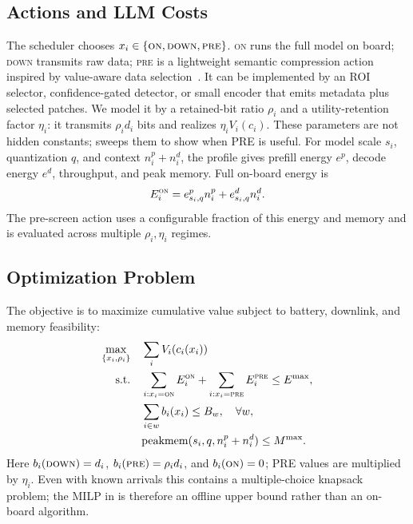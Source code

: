 \subsection{Actions and LLM Costs}
The scheduler chooses $x_i\in\{\textsc{on},\textsc{down},\textsc{pre}\}$. \textsc{on} runs the full model on board; \textsc{down} transmits raw data; \textsc{pre} is a lightweight semantic compression action inspired by value-aware data selection~\cite{denby2023kodan}. It can be implemented by an ROI selector, confidence-gated detector, or small encoder that emits metadata plus selected patches. We model it by a retained-bit ratio $\rho_i$ and a utility-retention factor $\eta_i$: it transmits $\rho_i d_i$ bits and realizes $\eta_i V_i(c_i)$. These parameters are not hidden constants;  sweeps them to show when PRE is useful. For model scale $s_i$, quantization $q$, and context $n_i^p+n_i^d$, the profile gives prefill energy $e^p$, decode energy $e^d$, throughput, and peak memory. Full on-board energy is
\begin{equation}
E_i^{\textsc{on}}=e^p_{s_i,q}n_i^p+e^d_{s_i,q}n_i^d .
\label{eq:eon}
\end{equation}
The pre-screen action uses a configurable fraction of this energy and memory and is evaluated across multiple $\rho_i,\eta_i$ regimes.

\subsection{Optimization Problem}
The objective is to maximize cumulative value subject to battery, downlink, and memory feasibility:
\begin{align}
\max_{\{x_i,\rho_i\}}\quad & \sum_i V_i(c_i(x_i)) \label{eq:obj}\\
\text{s.t.}\quad
& \sum_{i:x_i=\textsc{on}}E_i^{\textsc{on}}+\sum_{i:x_i=\textsc{pre}}E_i^{\textsc{pre}}\le E^{\max}, \label{eq:c-energy}\\
& \sum_{i\in w} b_i(x_i)\le B_w,\quad \forall w, \label{eq:c-bw}\\
& \mathrm{peakmem}(s_i,q,n_i^p+n_i^d)\le M^{\max}. \label{eq:c-mem}
\end{align}
Here $b_i(\textsc{down})=d_i$, $b_i(\textsc{pre})=\rho_i d_i$, and $b_i(\textsc{on})=0$; PRE values are multiplied by $\eta_i$. Even with known arrivals this contains a multiple-choice knapsack problem; the MILP in  is therefore an offline upper bound rather than an on-board algorithm.
